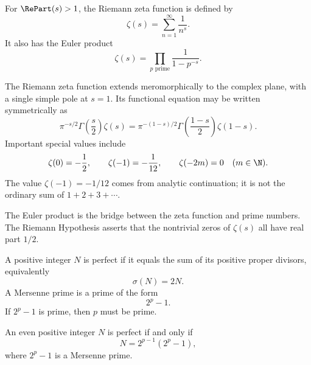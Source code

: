     \begin{definition}
        For $\RePart(s)>1$, the Riemann zeta function is defined by
        \[
            \zeta(s)
            =
            \sum_{n=1}^{\infty}\frac{1}{n^s}.
        \]
        It also has the Euler product
        \[
            \zeta(s)
            =
            \prod_{p\text{ prime}}
            \frac{1}{1-p^{-s}}.
        \]
    \end{definition}

    \begin{fact}
        The Riemann zeta function extends meromorphically to the complex plane,
        with a single simple pole at $s=1$. Its functional equation may be
        written symmetrically as
        \[
            \pi^{-s/2}\Gamma\!\left(\frac{s}{2}\right)\zeta(s)
            =
            \pi^{-(1-s)/2}\Gamma\!\left(\frac{1-s}{2}\right)\zeta(1-s).
        \]
        Important special values include
        \[
            \zeta(0)=-\frac12,
            \qquad
            \zeta(-1)=-\frac1{12},
            \qquad
            \zeta(-2m)=0\quad(m\in\N).
        \]
        The value $\zeta(-1)=-1/12$ comes from analytic continuation; it is not
        the ordinary sum of $1+2+3+\cdots$.
    \end{fact}

    \begin{remark}
        The Euler product is the bridge between the zeta function and prime
        numbers. The Riemann Hypothesis asserts that the nontrivial zeros of
        $\zeta(s)$ all have real part $1/2$.
    \end{remark}

    \begin{definition}
        A positive integer $N$ is perfect if it equals the sum of its positive
        proper divisors, equivalently
        \[
            \sigma(N)=2N.
        \]
        A Mersenne prime is a prime of the form
        \[
            2^p-1.
        \]
        If $2^p-1$ is prime, then $p$ must be prime.
    \end{definition}

    \begin{theorem}
        An even positive integer $N$ is perfect if and only if
        \[
            N=2^{p-1}(2^p-1),
        \]
        where $2^p-1$ is a Mersenne prime.
    \end{theorem}

